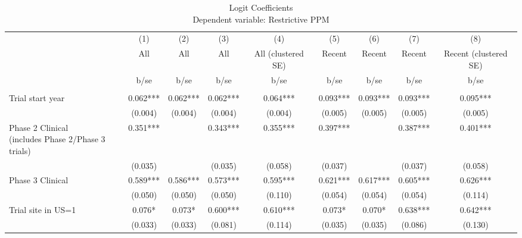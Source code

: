 
\begin{table}[htb]\centering
\caption{Logit Coefficients \\ Dependent variable: Restrictive PPM}
\begin{tabular}{l*{8}c}

 & (1) & (2) & (3) & (4) & (5) & (6) & (7) & (8)  \\
 & All & All & All & All (clustered SE) & Recent & Recent & Recent & Recent (clustered SE)  \\


                    &        b/se   &        b/se   &        b/se   &        b/se   &        b/se   &        b/se   &        b/se   &        b/se   \\

\hline

       &               &               &               &               &               &               &               &               \\
Trial start year    &       0.062***&       0.062***&       0.062***&       0.064***&       0.093***&       0.093***&       0.093***&       0.095***\\
                    &     (0.004)   &     (0.004)   &     (0.004)   &     (0.004)   &     (0.005)   &     (0.005)   &     (0.005)   &     (0.005)   \\
\shortstack[l]{Phase 2 Clinical\\(includes Phase 2/Phase 3 trials)}&       0.351***&               &       0.343***&       0.355***&       0.397***&               &       0.387***&       0.401***\\
                    &     (0.035)   &               &     (0.035)   &     (0.058)   &     (0.037)   &               &     (0.037)   &     (0.058)   \\
Phase 3 Clinical    &       0.589***&       0.586***&       0.573***&       0.595***&       0.621***&       0.617***&       0.605***&       0.626***\\
                    &     (0.050)   &     (0.050)   &     (0.050)   &     (0.110)   &     (0.054)   &     (0.054)   &     (0.054)   &     (0.114)   \\
Trial site in US=1  &       0.076*  &       0.073*  &       0.600***&       0.610***&       0.073*  &       0.070*  &       0.638***&       0.642***\\
                    &     (0.033)   &     (0.033)   &     (0.081)   &     (0.114)   &     (0.035)   &     (0.035)   &     (0.086)   &     (0.130)   \\

\end{tabular}
\end{table}
